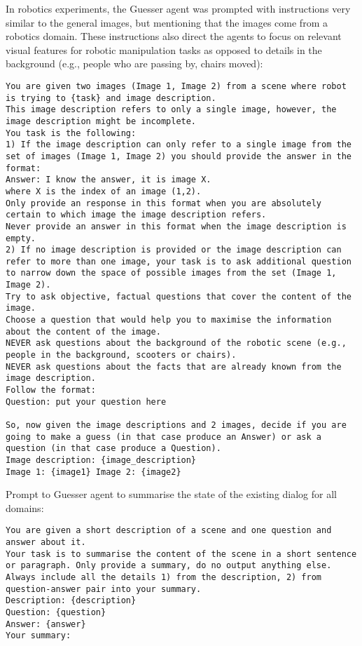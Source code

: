 In robotics experiments, the Guesser agent was prompted with instructions very similar to the general images, but mentioning that the images come from a robotics domain.
These instructions also direct the agents to focus on relevant visual features for robotic manipulation tasks as opposed to details in the background (e.g., people who are passing by, chairs moved):

\begin{lstlisting}
You are given two images (Image 1, Image 2) from a scene where robot is trying to {task} and image description.
This image description refers to only a single image, however, the image description might be incomplete.
You task is the following:
1) If the image description can only refer to a single image from the set of images (Image 1, Image 2) you should provide the answer in the format:
Answer: I know the answer, it is image X.
where X is the index of an image (1,2).
Only provide an response in this format when you are absolutely certain to which image the image description refers.
Never provide an answer in this format when the image description is empty.
2) If no image description is provided or the image description can refer to more than one image, your task is to ask additional question to narrow down the space of possible images from the set (Image 1, Image 2).
Try to ask objective, factual questions that cover the content of the image.
Choose a question that would help you to maximise the information about the content of the image.
NEVER ask questions about the background of the robotic scene (e.g., people in the background, scooters or chairs).
NEVER ask questions about the facts that are already known from the image description.
Follow the format:
Question: put your question here

So, now given the image descriptions and 2 images, decide if you are going to make a guess (in that case produce an Answer) or ask a question (in that case produce a Question).
Image description: {image_description}
Image 1: {image1} Image 2: {image2}
\end{lstlisting}

Prompt to Guesser agent to summarise the state of the existing dialog for all domains:

\begin{lstlisting}
You are given a short description of a scene and one question and answer about it.
Your task is to summarise the content of the scene in a short sentence or paragraph. Only provide a summary, do no output anything else.
Always include all the details 1) from the description, 2) from question-answer pair into your summary.
Description: {description}
Question: {question}
Answer: {answer}
Your summary: 
\end{lstlisting}

